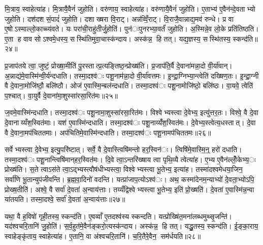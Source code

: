 मि॒त्राय॒ स्वाहेत्या॑ह। मि॒त्रायै॒वैनं॑ जुहोति। वरु॑णाय॒ स्वाहेत्या॑ह। वरु॑णायै॒वैनं॑ जुहोति। ए॒ताभ्य॑ ए॒वैन॑न्दे॒वताभ्यो जुहोति। दश॑दश सं॒पादं॑ जुहोति। दशाख्षरा वि॒राट्। अन्न॑व्विँ॒राट्। वि॒राजै॒वान्नाद्य॒मव॑ रुन्धे। प्र वा ए॒षोऽस्माल्लो॒काच्च्य॑वते। यः परा॑ची॒राहु॑तीर्जु॒होति॑। पुन॑ःपुनरभ्या॒वर्तं॑ जुहोति। अ॒स्मिन्ने॒व लो॒के प्रति॑तिष्ठति। ए॒ता ह वाव सोऽश्वमे॒धस्य॒ सस्थि॑तिमुवा॒चास्क॑न्दाय। अस्क॑न्न॒ हि तत्। यद्य॒ज्ञस्य॒ सस्थि॑तस्य॒ स्कन्द॑ति॥२४॥


प्र॒जाप॑तये त्वा॒ जुष्टं॒ प्रोख्षा॒मीति॑ पु॒रस्तात्प्र॒त्यङ्तिष्ठ॒न्प्रोख्ष॑ति। प्र॒जाप॑ति॒र्वै दे॒वाना॑मन्ना॒दो वी॒र्या॑वान्। अ॒न्नाद्य॑मे॒वास्मि॑न्वी॒र्य॑न्दधाति। तस्मा॒दश्व॑ः पशू॒नाम॑न्ना॒दो वी॒र्या॑वत्तमः। इ॒न्द्रा॒ग्निभ्या॒न्त्वेति॑ दख्षिण॒तः। इ॒न्द्रा॒ग्नी वै दे॒वाना॒मोजि॑ष्ठौ॒ बलि॑ष्ठौ। ओज॑ ए॒वास्मि॒न्बल॑न्दधाति। तस्मा॒दश्व॑ः पशू॒नामोजि॑ष्ठो॒ बलि॑ष्ठः। वा॒यवे॒ त्वेति॑ प॒श्चात्। वा॒युर्वै दे॒वाना॑मा॒शुस्सा॑रसा॒रित॑मः॥२५॥

ज॒वमे॒वास्मि॑न्दधाति। तस्मा॒दश्व॑ः पशू॒नामा॒शुस्सा॑रसा॒रित॑मः। विश्वेभ्यस्त्वा दे॒वेभ्य॒ इत्यु॑त्तर॒तः। विश्वे॒ वै दे॒वा दे॒वानाय्यँश॒स्वित॑माः। यश॑ ए॒वास्मि॑न्दधाति। तस्मा॒दश्व॑ः पशू॒नाय्यँ॑श॒स्वित॑मः। दे॒वेभ्य॒स्त्वेत्य॒धस्तात्। दे॒वा वै दे॒वाना॒मप॑चिततमाः। अप॑चितिमे॒वास्मि॑न्दधाति। तस्मा॒दश्व॑ः पशू॒नामप॑चिततमः॥२६॥

सर्वेभ्यस्त्वा दे॒वेभ्य॒ इत्यु॒परि॑ष्टात्। सर्वे॒ वै दे॒वास्त्विषि॑मन्तो हर॒स्विन॑ः। त्विषि॑मे॒वास्मि॒न्॒ हरो॑ दधाति। तस्मा॒दश्व॑ः पशू॒नान्त्विषि॑मान्‌हर॒स्वित॑मः। दि॒वे त्वा॒ऽन्तरि॑ख्षाय त्वा पृथि॒व्यै त्वेत्या॑ह। ए॒भ्य ए॒वैन॑ल्लोँ॒केभ्य॒ः प्रोख्ष॑ति। स॒ते त्वाऽस॑ते त्वा॒ऽद्भ्यस्त्वौष॑धीभ्यस्त्वा॒ विश्वेभ्यस्त्वा भू॒तेभ्य॒ इत्या॑ह। तस्मा॑दश्वमेधया॒जिन॒ सर्वा॑णि भू॒तान्युप॑जीवन्ति। ब्र॒ह्म॒वा॒दिनो॑ वदन्ति। यत्प्रा॑जाप॒त्योऽश्व॑ः। अथ॒ कस्मा॑देनम॒न्याभ्यो॑ दे॒वता॒भ्योऽपि॒ प्रोख्ष॒तीति॑। अश्वे॒ वै सर्वा॑ दे॒वता॑ अ॒न्वाय॑त्ताः। तय्यँद्विश्वेभ्यस्त्वा भू॒तेभ्य॒ इति॑ प्रो॒ख्षति॑। दे॒वता॑ ए॒वास्मि॑न्न॒न्वा या॑तयति। तस्मा॒दश्वे॒ सर्वा॑ दे॒वता॑ अ॒न्वाय॑त्ताः॥२७॥


यथा॒ वै ह॒विषो॑ गृही॒तस्य॒ स्कन्द॑ति। ए॒वव्वाँ ए॒तदश्व॑स्य स्कन्दति। यत्प्रोख्षि॑त॒मना॑लब्धमुथ्सृ॒जन्ति॑। यद॑श्वचरि॒तानि॑ जु॒होति॑। स॒र्व॒हुत॑मे॒वैन॑ङ्करो॒त्यस्क॑न्दाय। अस्क॑न्न॒ हि तत्। यद्धु॒तस्य॒ स्कन्द॑ति। ई॒ङ्का॒राय॒ स्वाहेङ्कृ॑ताय॒ स्वाहेत्या॑ह। ए॒तानि॒ वा अ॑श्वचरि॒तानि॑। च॒रि॒तैरे॒वैन॒ सम॑र्धयति॥२८॥


